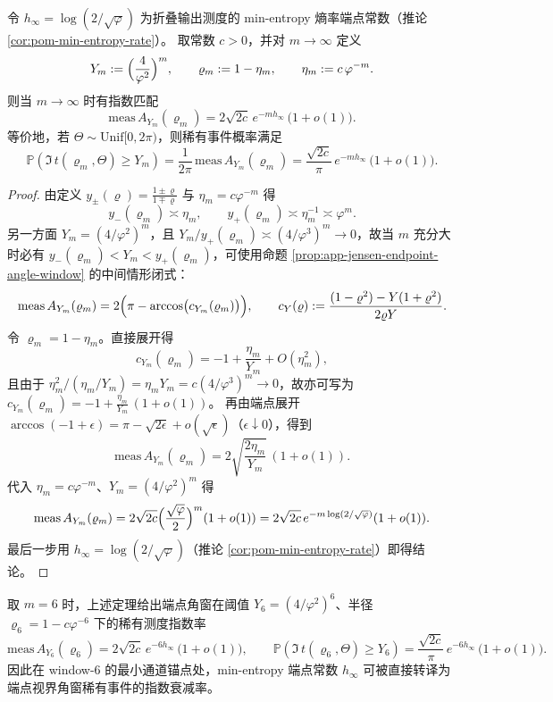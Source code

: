 \begin{theorem}\label{thm:app-endpoint-window-hinfty-match}
令 \(h_\infty=\log(2/\sqrt{\varphi})\) 为折叠输出测度的 min-entropy 熵率端点常数（推论 \ref{cor:pom-min-entropy-rate}）。
取常数 \(c>0\)，并对 \(m\to\infty\) 定义
\[
Y_m:=\Bigl(\frac{4}{\varphi^{2}}\Bigr)^{m},
\qquad
\varrho_m:=1-\eta_m,\qquad \eta_m:=c\,\varphi^{-m}.
\]
则当 \(m\to\infty\) 时有指数匹配
\[
\mathrm{meas}\,A_{Y_m}(\varrho_m)
=2\sqrt{2c}\,e^{-m h_\infty}\,\bigl(1+o(1)\bigr).
\]
等价地，若 \(\Theta\sim\mathrm{Unif}[0,2\pi)\)，则稀有事件概率满足
\[
\mathbb{P}\!\left(\Im\,t(\varrho_m,\Theta)\ge Y_m\right)
=\frac{1}{2\pi}\,\mathrm{meas}\,A_{Y_m}(\varrho_m)
=\frac{\sqrt{2c}}{\pi}\,e^{-m h_\infty}\,\bigl(1+o(1)\bigr).
\]
\end{theorem}

\begin{proof}
由定义 \(y_\pm(\varrho)=\frac{1\pm\varrho}{1\mp\varrho}\) 与 \(\eta_m=c\varphi^{-m}\) 得
\[
y_-(\varrho_m)\asymp \eta_m,\qquad
y_+(\varrho_m)\asymp \eta_m^{-1}\asymp \varphi^{m}.
\]
另一方面 \(Y_m=(4/\varphi^2)^m\)，且
\(
Y_m/y_+(\varrho_m)\asymp (4/\varphi^3)^m\to 0
\)，故当 \(m\) 充分大时必有 \(y_-(\varrho_m)<Y_m<y_+(\varrho_m)\)，可使用命题 \ref{prop:app-jensen-endpoint-angle-window} 的中间情形闭式：
\[
\mathrm{meas}\,A_{Y_m}(\varrho_m)
=2\Bigl(\pi-\arccos\bigl(c_{Y_m}(\varrho_m)\bigr)\Bigr),
\qquad
c_Y(\varrho):=\frac{(1-\varrho^2)-Y(1+\varrho^2)}{2\varrho Y}.
\]
令 \(\varrho_m=1-\eta_m\)。直接展开得
\[
c_{Y_m}(\varrho_m)
=-1+\frac{\eta_m}{Y_m}+O(\eta_m^2),
\]
且由于
\(
\eta_m^2/(\eta_m/Y_m)=\eta_m Y_m=c(4/\varphi^3)^m\to 0
\)，故亦可写为
\(
c_{Y_m}(\varrho_m)=-1+\frac{\eta_m}{Y_m}\,(1+o(1))
\)。
再由端点展开 \(\arccos(-1+\epsilon)=\pi-\sqrt{2\epsilon}+o(\sqrt\epsilon)\)（\(\epsilon\downarrow 0\)），得到
\[
\mathrm{meas}\,A_{Y_m}(\varrho_m)
=2\sqrt{\frac{2\eta_m}{Y_m}}\,(1+o(1)).
\]
代入 \(\eta_m=c\varphi^{-m}\)、\(Y_m=(4/\varphi^2)^m\) 得
\[
\mathrm{meas}\,A_{Y_m}(\varrho_m)
=2\sqrt{2c}\Bigl(\frac{\sqrt{\varphi}}{2}\Bigr)^m(1+o(1))
=2\sqrt{2c}\,e^{-m\log(2/\sqrt{\varphi})}(1+o(1)).
\]
最后一步用 \(h_\infty=\log(2/\sqrt{\varphi})\)（推论 \ref{cor:pom-min-entropy-rate}）即得结论。
\end{proof}

\begin{remark}\label{rem:app-endpoint-window-window6}
取 \(m=6\) 时，上述定理给出端点角窗在阈值 \(Y_6=(4/\varphi^2)^6\)、半径 \(\varrho_6=1-c\varphi^{-6}\) 下的稀有测度指数率
\[
\mathrm{meas}\,A_{Y_6}(\varrho_6)
=2\sqrt{2c}\,e^{-6h_\infty}\,\bigl(1+o(1)\bigr),
\qquad
\mathbb{P}\!\left(\Im\,t(\varrho_6,\Theta)\ge Y_6\right)
=\frac{\sqrt{2c}}{\pi}\,e^{-6h_\infty}\,\bigl(1+o(1)\bigr).
\]
因此在 window-\(6\) 的最小通道锚点处，min-entropy 端点常数 \(h_\infty\) 可被直接转译为端点视界角窗稀有事件的指数衰减率。
\end{remark}

